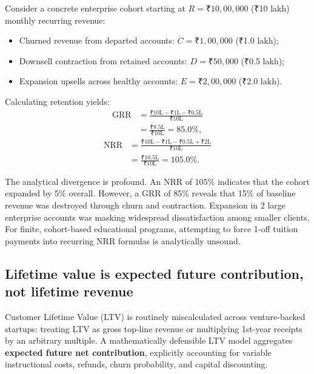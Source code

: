 Consider a concrete enterprise cohort starting at $R = ₹10,00,000$ (₹10 lakh) monthly recurring revenue:
\begin{itemize}
\item Churned revenue from departed accounts: $C = ₹1,00,000$ (₹1.0 lakh);
\item Downsell contraction from retained accounts: $D = ₹50,000$ (₹0.5 lakh);
\item Expansion upsells across healthy accounts: $E = ₹2,00,000$ (₹2.0 lakh).
\end{itemize}
Calculating retention yields:
\begin{equation}
\begin{aligned}
\text{GRR} &= \frac{₹10\text{L} - ₹1\text{L} - ₹0.5\text{L}}{₹10\text{L}} \\
&= \frac{₹8.5\text{L}}{₹10\text{L}} = 85.0\%,
\end{aligned}
\end{equation}
\begin{equation}
\begin{aligned}
\text{NRR} &= \frac{₹10\text{L} - ₹1\text{L} - ₹0.5\text{L} + ₹2\text{L}}{₹10\text{L}} \\
&= \frac{₹10.5\text{L}}{₹10\text{L}} = 105.0\%.
\end{aligned}
\end{equation}

The analytical divergence is profound. An NRR of 105\% indicates that the cohort expanded by 5\% overall. However, a GRR of 85\% reveals that 15\% of baseline revenue was destroyed through churn and contraction. Expansion in 2 large enterprise accounts was masking widespread dissatisfaction among smaller clients. For finite, cohort-based educational programs, attempting to force 1-off tuition payments into recurring NRR formulas is analytically unsound.

\subsection{Lifetime value is expected future contribution, not lifetime revenue}

Customer Lifetime Value (LTV) is routinely miscalculated across venture-backed startups: treating LTV as gross top-line revenue or multiplying 1st-year receipts by an arbitrary multiple. A mathematically defensible LTV model aggregates \textbf{expected future net contribution}, explicitly accounting for variable instructional costs, refunds, churn probability, and capital discounting.

